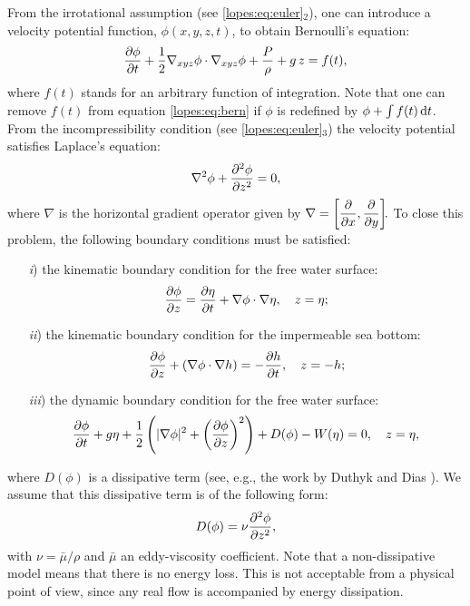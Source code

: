 From the irrotational assumption (see \eqref{lopes:eq:euler}\(_2\)), one can  introduce a
velocity potential function, \(\phi(x,y,z,t)\), to obtain  Bernoulli's equation:
\begin{equation}\label{lopes:eq:bern}
\frac{\partial  \phi}{\partial  t}+\frac{1}{2}\nabla_{xyz} \phi \cdot\nabla_{xyz} \phi
+\frac{P}{\rho} +g\, z=f(t),
\end{equation}
where \(f(t)\) stands
for  an arbitrary function of integration.
 Note that one can   remove
 \(f(t)\)  from equation \eqref{lopes:eq:bern} if  \(\phi\) is
 redefined by \(\phi+\int f(t)\, {\rm d}t\).
From the incompressibility condition
(see \eqref{lopes:eq:euler}\(_3\))
 the velocity potential  satisfies  Laplace's equation:
\begin{equation}\label{lopes:eq:laplace}
\nabla^2\phi+\frac{\partial ^2\phi}{\partial z^2}=0,
\end{equation}
where \(\nabla\) is the  horizontal gradient operator given
by \(\displaystyle \nabla=\left[\frac{\partial }{\partial x},\frac{\partial }{\partial y}\right]\!\!.\)
To close this problem,  the following boundary conditions
must be satisfied:
\begin{enumerate}
\item[{\it i})]  the kinematic boundary condition for the free water surface:
\begin{equation}
\frac{\partial \phi}{\partial z}=\frac{\partial \eta}{\partial t}+\nabla\phi\cdot\nabla\eta,\quad z=\eta;
\end{equation}
\item[{\it ii})] the kinematic boundary condition for the impermeable sea bottom:
\begin{equation}
\frac{\partial \phi}{\partial z}+(\nabla\phi\cdot\nabla h)=-\frac{\partial h}{\partial t},
\quad z=-h ;
\end{equation}
\item[{\it iii})] the dynamic boundary condition for the free
water surface:
\begin{equation}\label{lopes:eq:dyn}
\frac{\partial \phi}{\partial t}+ g\eta+\frac{1}{2}
\left(|\nabla\phi|^2 +\left(\frac{\partial \phi}{\partial z}\right)^2\right)+
D(\phi)-W(\eta) = 0,
\quad z =\eta,
\end{equation}
\end{enumerate}
where \(D(\phi)\) is a  dissipative term (see, e.g., the work by Duthyk and
Dias \cite{DutykhDias2007}).
We assume that this dissipative term
 is of the following form:
\begin{equation}\label{lopes:eq:diss}
 D(\phi)=\nu\frac{\partial ^2\phi}{\partial z^2},
\end{equation}
with  \(\nu=\bar{\mu}/\rho\)  and \(\bar{\mu}\) an
 eddy-viscosity coefficient.
 Note that a
non-dissipative model means that there is no energy loss.
This is not acceptable from a physical point of view, since
any real flow is accompanied by energy dissipation.

